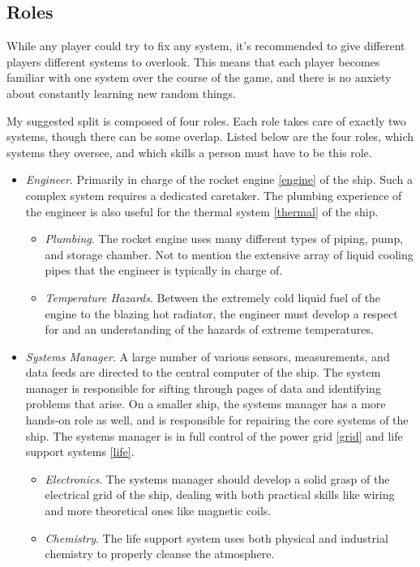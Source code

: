 \documentclass[a4paper]{article}
\begin{document}
\subsection{Roles} \label{roles}

While any player could try to fix any system, it's recommended to give different players different systems to overlook. This means that each player becomes familiar with one system over the course of the game, and there is no anxiety about constantly learning new random things. 

My suggested split is composed of four roles. Each role takes care of exactly two systems, though there can be some overlap. Listed below are the four roles, which systems they oversee, and which skills a person must have to be this role.
\begin{itemize}
\item \textit{Engineer}. Primarily in charge of the rocket engine \ref{engine} of the ship. Such a complex system requires a dedicated caretaker. The plumbing experience of the engineer is also useful for the thermal system \ref{thermal} of the ship.
\begin{itemize}
\item \textit{Plumbing}. The rocket engine uses many different types of piping, pump, and storage chamber. Not to mention the extensive array of liquid cooling pipes that the engineer is typically in charge of.
\item \textit{Temperature Hazards}. Between the extremely cold liquid fuel of the engine to the blazing hot radiator, the engineer must develop a respect for and an understanding of the hazards of extreme temperatures.
\end{itemize}
\item \textit{Systems Manager}. A large number of various sensors, measurements, and data feeds are directed to the central computer of the ship. The system manager is responsible for sifting through pages of data and identifying problems that arise. On a smaller ship, the systems manager has a more hands-on role as well, and is responsible for repairing the core systems of the ship. The systems manager is in full control of the power grid \ref{grid} and life support systems \ref{life}.
\begin{itemize}
\item \textit{Electronics}. The systems manager should develop a solid grasp of the electrical grid of the ship, dealing with both practical skills like wiring and more theoretical ones like magnetic coils.
\item \textit{Chemistry}. The life support system uses both physical and industrial chemistry to properly cleanse the atmosphere. 

\end{itemize}
\end{itemize}
\end{document}
